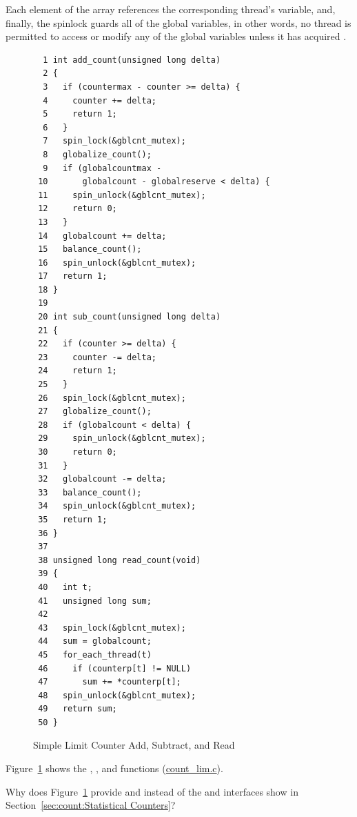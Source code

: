 Each element of the  array references the corresponding
thread's  variable, and, finally, the 
spinlock guards all of the global variables, in other words, no thread
is permitted to access or modify any of the global variables unless it
has acquired .

\begin{figure}[tbp]
{ \scriptsize
\begin{verbatim}
  1 int add_count(unsigned long delta)
  2 {
  3   if (countermax - counter >= delta) {
  4     counter += delta;
  5     return 1;
  6   }
  7   spin_lock(&gblcnt_mutex);
  8   globalize_count();
  9   if (globalcountmax -
 10       globalcount - globalreserve < delta) {
 11     spin_unlock(&gblcnt_mutex);
 12     return 0;
 13   }
 14   globalcount += delta;
 15   balance_count();
 16   spin_unlock(&gblcnt_mutex);
 17   return 1;
 18 }
 19 
 20 int sub_count(unsigned long delta)
 21 {
 22   if (counter >= delta) {
 23     counter -= delta;
 24     return 1;
 25   }
 26   spin_lock(&gblcnt_mutex);
 27   globalize_count();
 28   if (globalcount < delta) {
 29     spin_unlock(&gblcnt_mutex);
 30     return 0;
 31   }
 32   globalcount -= delta;
 33   balance_count();
 34   spin_unlock(&gblcnt_mutex);
 35   return 1;
 36 }
 37 
 38 unsigned long read_count(void)
 39 {
 40   int t;
 41   unsigned long sum;
 42 
 43   spin_lock(&gblcnt_mutex);
 44   sum = globalcount;
 45   for_each_thread(t)
 46     if (counterp[t] != NULL)
 47       sum += *counterp[t];
 48   spin_unlock(&gblcnt_mutex);
 49   return sum;
 50 }
\end{verbatim}
}
\caption{Simple Limit Counter Add, Subtract, and Read}
\label{fig:count:Simple Limit Counter Add, Subtract, and Read}
\end{figure}

Figure~\ref{fig:count:Simple Limit Counter Add, Subtract, and Read}
shows the , , and 
functions (\url{count_lim.c}).


\QuickQuiz{}
	Why does
	Figure~\ref{fig:count:Simple Limit Counter Add, Subtract, and Read}
	provide  and  instead of the
	 and  interfaces show in
	Section~\ref{sec:count:Statistical Counters}?
 \QuickQuizEnd

